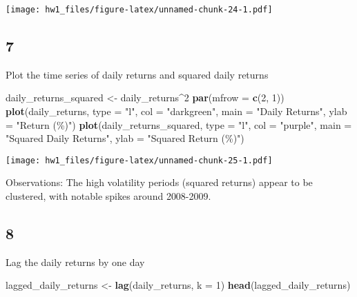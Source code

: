 \documentclass[
]{article}
\newenvironment{Shaded}{\begin{snugshade}}{\end{snugshade}}
\newcommand{\AttributeTok}[1]{\textcolor[rgb]{0.13,0.29,0.53}{#1}}
\newcommand{\DecValTok}[1]{\textcolor[rgb]{0.00,0.00,0.81}{#1}}
\newcommand{\FunctionTok}[1]{\textcolor[rgb]{0.13,0.29,0.53}{\textbf{#1}}}
\newcommand{\NormalTok}[1]{#1}
\newcommand{\OtherTok}[1]{\textcolor[rgb]{0.56,0.35,0.01}{#1}}
\newcommand{\SpecialCharTok}[1]{\textcolor[rgb]{0.81,0.36,0.00}{\textbf{#1}}}
\newcommand{\StringTok}[1]{\textcolor[rgb]{0.31,0.60,0.02}{#1}}
\begin{document}
\texttt{[image: hw1\_files/figure-latex/unnamed-chunk-24-1.pdf]}

\subsection{7}\label{section-6}

Plot the time series of daily returns and squared daily returns

\begin{Shaded}
\begin{Highlighting}[]
\NormalTok{daily\_returns\_squared }\OtherTok{\textless{}{-}}\NormalTok{ daily\_returns}\SpecialCharTok{\^{}}\DecValTok{2}
\FunctionTok{par}\NormalTok{(}\AttributeTok{mfrow =} \FunctionTok{c}\NormalTok{(}\DecValTok{2}\NormalTok{, }\DecValTok{1}\NormalTok{))}
\FunctionTok{plot}\NormalTok{(daily\_returns, }\AttributeTok{type =} \StringTok{"l"}\NormalTok{, }\AttributeTok{col =} \StringTok{"darkgreen"}\NormalTok{, }\AttributeTok{main =} \StringTok{"Daily Returns"}\NormalTok{, }\AttributeTok{ylab =} \StringTok{"Return (\%)"}\NormalTok{)}
\FunctionTok{plot}\NormalTok{(daily\_returns\_squared, }\AttributeTok{type =} \StringTok{"l"}\NormalTok{, }\AttributeTok{col =} \StringTok{"purple"}\NormalTok{, }\AttributeTok{main =} \StringTok{"Squared Daily Returns"}\NormalTok{, }\AttributeTok{ylab =} \StringTok{"Squared Return (\%)"}\NormalTok{)}
\end{Highlighting}
\end{Shaded}

\texttt{[image: hw1\_files/figure-latex/unnamed-chunk-25-1.pdf]}

Observations: The high volatility periods (squared returns) appear to be
clustered, with notable spikes around 2008-2009.

\subsection{8}\label{section-7}

Lag the daily returns by one day

\begin{Shaded}
\begin{Highlighting}[]
\NormalTok{lagged\_daily\_returns }\OtherTok{\textless{}{-}} \FunctionTok{lag}\NormalTok{(daily\_returns, }\AttributeTok{k =} \DecValTok{1}\NormalTok{)}
\FunctionTok{head}\NormalTok{(lagged\_daily\_returns)}
\end{Highlighting}
\end{Shaded}
\end{document}
